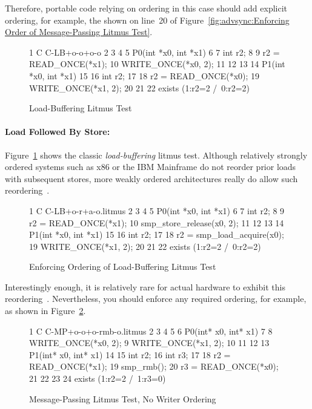 Therefore, portable code relying on ordering in this case should
add explicit ordering, for example, the  shown on
line~20 of
Figure~\ref{fig:advsync:Enforcing Order of Message-Passing Litmus Test}.

\begin{figure}[tbp]
{ \scriptsize
\begin{verbbox}
 1 C C-LB+o-o+o-o
 2 {
 3 }
 4
 5 P0(int *x0, int *x1)
 6 {
 7   int r2;
 8
 9   r2 = READ_ONCE(*x1);
10   WRITE_ONCE(*x0, 2);
11 }
12
13
14 P1(int *x0, int *x1)
15 {
16   int r2;
17
18   r2 = READ_ONCE(*x0);
19   WRITE_ONCE(*x1, 2);
20 }
21
22 exists (1:r2=2 /\ 0:r2=2)
\end{verbbox}
}
\centering
\theverbbox
\caption{Load-Buffering Litmus Test}
\label{fig:advsync:Load-Buffering Litmus Test}
\end{figure}

\paragraph{Load Followed By Store:}
Figure~\ref{fig:advsync:Load-Buffering Litmus Test}
shows the classic \emph{load-buffering} litmus test.
Although relatively strongly ordered systems such as x86
or the IBM Mainframe do not reorder prior loads with subsequent stores,
more weakly ordered architectures really do allow such
reordering~\cite{JadeAlglave2011ppcmem}.

\begin{figure}[tbp]
{ \scriptsize
\begin{verbbox}
 1 C C-LB+o-r+a-o.litmus
 2 {
 3 }
 4
 5 P0(int *x0, int *x1)
 6 {
 7   int r2;
 8
 9   r2 = READ_ONCE(*x1);
10   smp_store_release(x0, 2);
11 }
12
13
14 P1(int *x0, int *x1)
15 {
16   int r2;
17
18   r2 = smp_load_acquire(x0);
19   WRITE_ONCE(*x1, 2);
20 }
21
22 exists (1:r2=2 /\ 0:r2=2)
\end{verbbox}
}
\centering
\theverbbox
\caption{Enforcing Ordering of Load-Buffering Litmus Test}
\label{fig:advsync:Enforcing Ordering of Load-Buffering Litmus Test}
\end{figure}

Interestingly enough, it is relatively rare for actual hardware to
exhibit this reordering~\cite{LucMaranget2017aarch64}.
Nevertheless, you should enforce any required ordering, for example,
as shown in
Figure~\ref{fig:advsync:Enforcing Ordering of Load-Buffering Litmus Test}.

\begin{figure}[tbp]
{ \scriptsize
\begin{verbbox}
 1 C C-MP+o-o+o-rmb-o.litmus
 2
 3 {
 4 }
 5
 6 P0(int* x0, int* x1) {
 7
 8   WRITE_ONCE(*x0, 2);
 9   WRITE_ONCE(*x1, 2);
10
11 }
12
13 P1(int* x0, int* x1) {
14
15   int r2;
16   int r3;
17
18   r2 = READ_ONCE(*x1);
19   smp_rmb();
20   r3 = READ_ONCE(*x0);
21
22 }
23
24 exists (1:r2=2 /\ 1:r3=0)
\end{verbbox}
}
\centering
\theverbbox
\caption{Message-Passing Litmus Test, No Writer Ordering}
\label{fig:advsync:Message-Passing Litmus Test, No Writer Ordering}
\end{figure}


